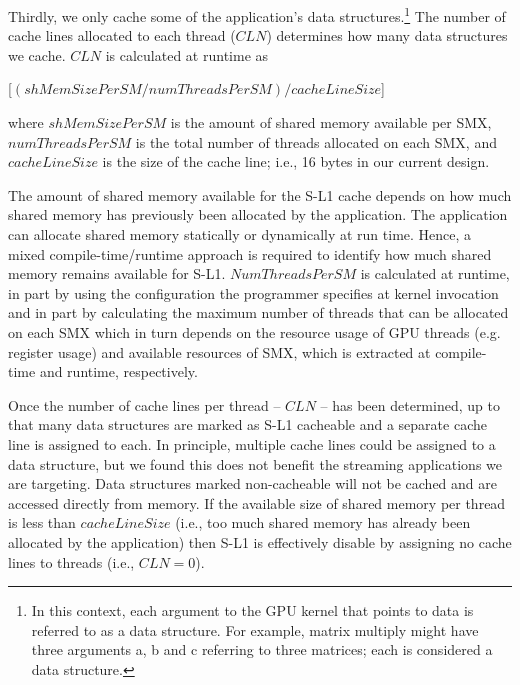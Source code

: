 
Thirdly, we only cache some of the application's data structures.\footnote{
    In this context, each argument to the GPU kernel that points to data is referred to as a data structure. 
    For example, matrix multiply might have three arguments a, b and c referring to three matrices;
    each is considered a data structure.}
The number of cache lines allocated to each thread ($CLN$) determines how many data structures we cache.
$CLN$ is calculated at runtime as
\begin{center} 
[$(shMemSizePerSM / numThreadsPerSM) / cacheLineSize$]
\end{center}
where $shMemSizePerSM$ is the amount of shared memory available per SMX, $numThreadsPerSM$ is the
total number of threads allocated on each SMX, and $cacheLineSize$ is the size of the cache line;
i.e., 16 bytes in our current design. 

The amount of shared memory available for the S-L1 cache depends on how much shared memory has previously been allocated by the application.
The application can allocate shared memory statically or dynamically at run time.
Hence, a mixed compile-time/runtime approach is required to identify how much shared memory remains available for S-L1.
$NumThreadsPerSM$ is calculated at runtime, in part by using the configuration
the programmer specifies at kernel invocation
and in part by calculating the maximum number of threads that can be allocated on each SMX which in
turn depends on the resource usage of GPU threads (e.g. register usage) and available
resources of SMX, which is extracted at compile-time and runtime, respectively.

Once the number of cache lines per thread -- $CLN$ -- has been determined, up to that many data structures are marked as S-L1 cacheable and a separate cache line is assigned to each.
In principle, multiple cache lines could be assigned to a data structure, but we found this does not benefit the streaming applications we are targeting.
Data structures marked non-cacheable will not be cached and are accessed directly from memory. 
If the available size of shared memory per thread is less than $cacheLineSize$ (i.e., too much shared memory has already been allocated by the application) then S-L1 is effectively disable by assigning no cache lines to threads (i.e., $CLN = 0$). 

